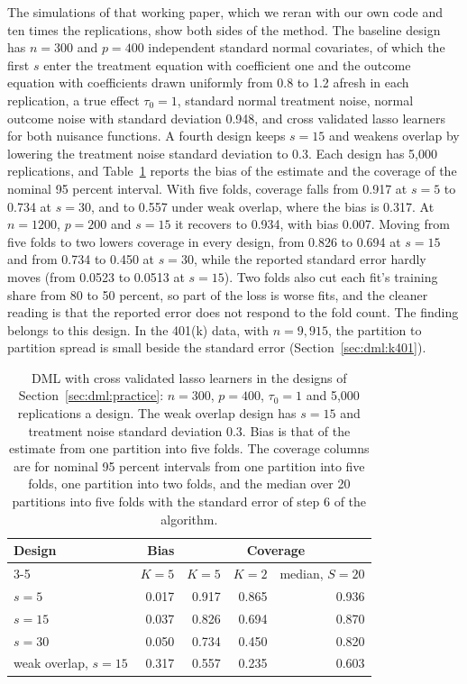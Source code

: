 The simulations of that working paper, which we reran with our own code and ten times the replications, show both sides of the method. The baseline design has $n = 300$ and $p = 400$ independent standard normal covariates, of which the first $s$ enter the treatment equation with coefficient one and the outcome equation with coefficients drawn uniformly from 0.8 to 1.2 afresh in each replication, a true effect $\tau_0 = 1$, standard normal treatment noise, normal outcome noise with standard deviation 0.948, and cross validated lasso learners for both nuisance functions. A fourth design keeps $s = 15$ and weakens overlap by lowering the treatment noise standard deviation to 0.3. Each design has 5,000 replications, and Table~\ref{tab:dml:sims} reports the bias of the estimate and the coverage of the nominal 95 percent interval. With five folds, coverage falls from 0.917 at $s = 5$ to 0.734 at $s = 30$, and to 0.557 under weak overlap, where the bias is 0.317. At $n = 1200$, $p = 200$ and $s = 15$ it recovers to 0.934, with bias 0.007. Moving from five folds to two lowers coverage in every design, from 0.826 to 0.694 at $s = 15$ and from 0.734 to 0.450 at $s = 30$, while the reported standard error hardly moves (from 0.0523 to 0.0513 at $s = 15$). Two folds also cut each fit's training share from 80 to 50 percent, so part of the loss is worse fits, and the cleaner reading is that the reported error does not respond to the fold count. The finding belongs to this design. In the 401(k) data, with $n = 9{,}915$, the partition to partition spread is small beside the standard error (Section~\ref{sec:dml:k401}).

\begin{table}[ht]
\centering
\caption{DML with cross validated lasso learners in the designs of Section~\ref{sec:dml:practice}: $n = 300$, $p = 400$, $\tau_0 = 1$ and 5,000 replications a design. The weak overlap design has $s = 15$ and treatment noise standard deviation 0.3. Bias is that of the estimate from one partition into five folds. The coverage columns are for nominal 95 percent intervals from one partition into five folds, one partition into two folds, and the median over 20 partitions into five folds with the standard error of step 6 of the algorithm.}
\label{tab:dml:sims}
\small
\begin{tabular}{lrrrr}
\toprule
Design & Bias & \multicolumn{3}{c}{Coverage} \\
\cmidrule(lr){3-5}
 & $K = 5$ & $K = 5$ & $K = 2$ & median, $S = 20$ \\
\midrule
$s = 5$ & 0.017 & 0.917 & 0.865 & 0.936 \\
$s = 15$ & 0.037 & 0.826 & 0.694 & 0.870 \\
$s = 30$ & 0.050 & 0.734 & 0.450 & 0.820 \\
weak overlap, $s = 15$ & 0.317 & 0.557 & 0.235 & 0.603 \\
\bottomrule
\end{tabular}
\end{table}

